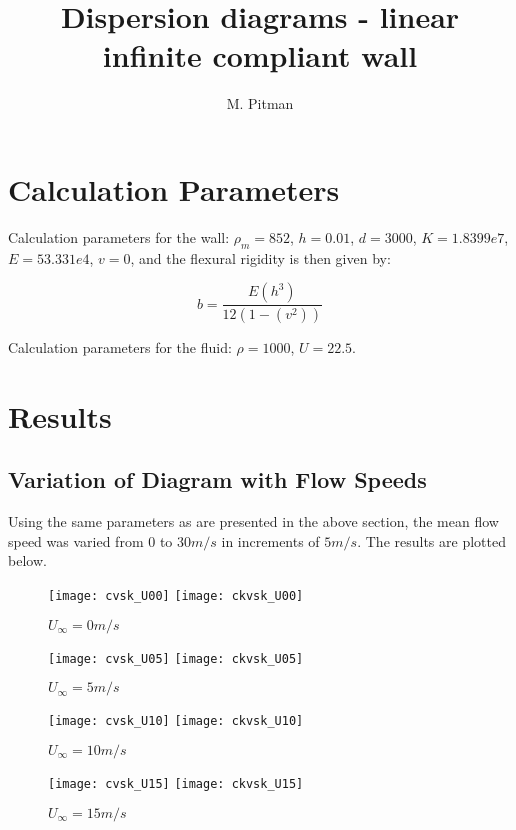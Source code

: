 \documentclass[a4paper,10pt]{article}
\title{Dispersion diagrams - linear infinite compliant wall}
\author{M. Pitman}
\begin{document}
\maketitle

\section{Calculation Parameters}

Calculation parameters for the wall: $\rho_m = 852$, $h = 0.01$, $d = 3000$, $K = 1.8399e7$, $E = 53.331e4$, $v = 0$, and the flexural rigidity is then given by:

\begin{equation}
 b = \frac{E(h^3)}{12(1-(v^2))}
\end{equation}

Calculation parameters for the fluid: $\rho = 1000$, $U = 22.5$.

\section{Results}

\subsection{Variation of Diagram with Flow Speeds}
Using the same parameters as are presented in the above section, the mean flow speed was varied from $0$ to $30m/s$ in increments of $5m/s$.  The results are plotted below.

\begin{figure}[htb]
\centering
 \texttt{[image: cvsk\_U00]}
 \texttt{[image: ckvsk\_U00]}
\caption{$U_\infty = 0 m/s$}
\end{figure}

\begin{figure}[htb]
\centering
 \texttt{[image: cvsk\_U05]}
 \texttt{[image: ckvsk\_U05]}
\caption{$U_\infty = 5 m/s$}
\end{figure}

\begin{figure}[htb]
\centering
 \texttt{[image: cvsk\_U10]}
 \texttt{[image: ckvsk\_U10]}
\caption{$U_\infty = 10 m/s$}
\end{figure}

\begin{figure}[htb]
\centering
 \texttt{[image: cvsk\_U15]}
 \texttt{[image: ckvsk\_U15]}
\caption{$U_\infty = 15 m/s$}
\end{figure}
\end{document}
